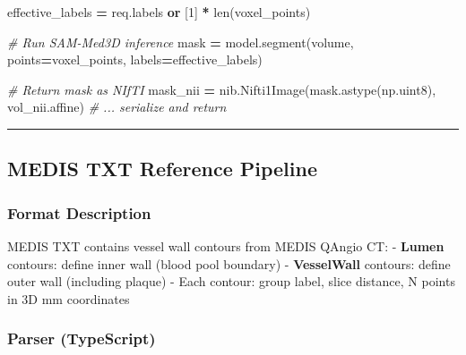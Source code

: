 \documentclass[
  11pt,
]{article}
\newenvironment{Shaded}{\begin{snugshade}}{\end{snugshade}}
\newcommand{\BuiltInTok}[1]{#1}
\newcommand{\CommentTok}[1]{\textcolor[rgb]{0.56,0.35,0.01}{\textit{#1}}}
\newcommand{\DecValTok}[1]{\textcolor[rgb]{0.00,0.00,0.81}{#1}}
\newcommand{\KeywordTok}[1]{\textcolor[rgb]{0.13,0.29,0.53}{\textbf{#1}}}
\newcommand{\NormalTok}[1]{#1}
\newcommand{\OperatorTok}[1]{\textcolor[rgb]{0.81,0.36,0.00}{\textbf{#1}}}
\begin{document}
\begin{Shaded}
\begin{Highlighting}[]
\NormalTok{    effective\_labels }\OperatorTok{=}\NormalTok{ req.labels }\KeywordTok{or}\NormalTok{ [}\DecValTok{1}\NormalTok{] }\OperatorTok{*} \BuiltInTok{len}\NormalTok{(voxel\_points)}

    \CommentTok{\# Run SAM{-}Med3D inference}
\NormalTok{    mask }\OperatorTok{=}\NormalTok{ model.segment(volume, points}\OperatorTok{=}\NormalTok{voxel\_points, labels}\OperatorTok{=}\NormalTok{effective\_labels)}

    \CommentTok{\# Return mask as NIfTI}
\NormalTok{    mask\_nii }\OperatorTok{=}\NormalTok{ nib.Nifti1Image(mask.astype(np.uint8), vol\_nii.affine)}
    \CommentTok{\# ... serialize and return}
\end{Highlighting}
\end{Shaded}

\begin{center}\rule{0.5\linewidth}{0.5pt}\end{center}

\subsection{MEDIS TXT Reference
Pipeline}\label{medis-txt-reference-pipeline}

\subsubsection{Format Description}\label{format-description}

MEDIS TXT contains vessel wall contours from MEDIS QAngio CT: -
\textbf{Lumen} contours: define inner wall (blood pool boundary) -
\textbf{VesselWall} contours: define outer wall (including plaque) -
Each contour: group label, slice distance, N points in 3D mm coordinates

\subsubsection{Parser (TypeScript)}\label{parser-typescript}
\end{document}
